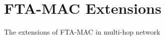 \chapter{FTA-MAC Extensions} %
\label{ftamac-extensions}
The extensions of FTA-MAC in multi-hop network